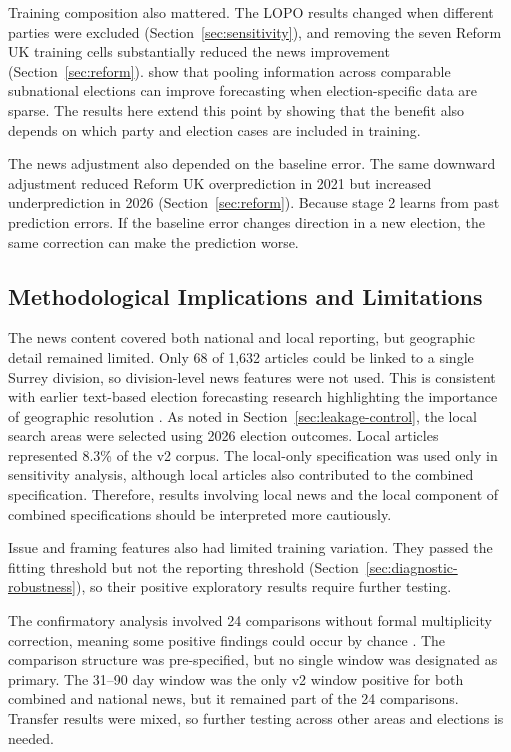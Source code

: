 \documentclass[final-report]{report-template}
\begin{document}
Training composition also mattered. The LOPO results changed when different parties were excluded (Section~\ref{sec:sensitivity}), and removing the seven Reform UK training cells substantially reduced the news improvement (Section~\ref{sec:reform}). \textcite{STOETZER2025102939} show that pooling information across comparable subnational elections can improve forecasting when election-specific data are sparse. The results here extend this point by showing that the benefit also depends on which party and election cases are included in training.

The news adjustment also depended on the baseline error. The same downward adjustment reduced Reform UK overprediction in 2021 but increased underprediction in 2026 (Section~\ref{sec:reform}). Because stage 2 learns from past prediction errors. If the baseline error changes direction in a new election, the same correction can make the prediction worse.

\subsection{Methodological Implications and Limitations}

The news content covered both national and local reporting, but geographic detail remained limited. Only 68 of 1,632 articles could be linked to a single Surrey division, so division-level news features were not used. This is consistent with earlier text-based election forecasting research highlighting the importance of geographic resolution \parencite{BURNAP2016230}. As noted in Section~\ref{sec:leakage-control}, the local search areas were selected using 2026 election outcomes. Local articles represented 8.3\% of the v2 corpus. The local-only specification was used only in sensitivity analysis, although local articles also contributed to the combined specification. Therefore, results involving local news and the local component of combined specifications should be interpreted more cautiously.

Issue and framing features also had limited training variation. They passed the fitting threshold but not the reporting threshold (Section~\ref{sec:diagnostic-robustness}), so their positive exploratory results require further testing.

The confirmatory analysis involved 24 comparisons without formal multiplicity correction, meaning some positive findings could occur by chance \parencite{Liu_Shiraito_2023}. The comparison structure was pre-specified, but no single window was designated as primary. The 31--90 day window was the only v2 window positive for both combined and national news, but it remained part of the 24 comparisons. Transfer results were mixed, so further testing across other areas and elections is needed.
\end{document}
